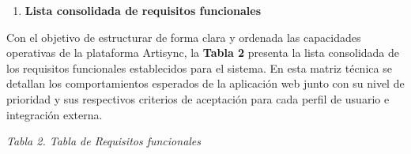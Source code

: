 \documentclass[
]{article}
\begin{document}
\begin{enumerate}
\def\labelenumi{\arabic{enumi}.}
\setcounter{enumi}{1}
\item
  \textbf{Lista consolidada de requisitos funcionales}
\end{enumerate}

Con el objetivo de estructurar de forma clara y ordenada las capacidades
operativas de la plataforma Artisync, la \textbf{Tabla 2} presenta la
lista consolidada de los requisitos funcionales establecidos para el
sistema. En esta matriz técnica se detallan los comportamientos
esperados de la aplicación web junto con su nivel de prioridad y sus
respectivos criterios de aceptación para cada perfil de usuario e
integración externa.

\emph{Tabla 2. Tabla de Requisitos funcionales}
\end{document}
